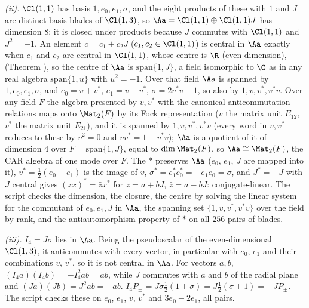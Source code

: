 \emph{(ii).} $\Cl(1,1)$ has basis $1, e_{0}, e_{1}, \sigma$, and the eight products of these with $1$ and $J$ are distinct basis blades of $\Cl(1,3)$, so $\Aa = \Cl(1,1) \oplus \Cl(1,1)J$ has dimension $8$; it is closed under products because $J$ commutes with $\Cl(1,1)$ and $J^{2} = -1$. An element $c = c_{1} + c_{2}J$ ($c_{1}, c_{2} \in \Cl(1,1)$) is central in $\Aa$ exactly when $c_{1}$ and $c_{2}$ are central in $\Cl(1,1)$, whose centre is $\R$ (even dimension), (Theorem ), so the centre of $\Aa$ is $\mathrm{span}\{1, J\}$, a field isomorphic to $\C$ as in any real algebra $\mathrm{span}\{1, u\}$ with $u^{2} = -1$. Over that field $\Aa$ is spanned by $1, e_{0}, e_{1}, \sigma$, and $e_{0} = v + v^{*}$, $e_{1} = v - v^{*}$, $\sigma = 2v^{*}v - 1$, so also by $1, v, v^{*}, v^{*}v$. Over any field $F$ the algebra presented by $v, v^{*}$ with the canonical anticommutation relations maps onto $\Mat_{2}(F)$ by its Fock representation ($v$ the matrix unit $E_{12}$, $v^{*}$ the matrix unit $E_{21}$), and it is spanned by $1, v, v^{*}, v^{*}v$ (every word in $v, v^{*}$ reduces to these by $v^{2} = 0$ and $vv^{*} = 1 - v^{*}v$); $\Aa$ is a quotient of it of dimension $4$ over $F = \mathrm{span}\{1, J\}$, equal to $\dim \Mat_{2}(F)$, so $\Aa \cong \Mat_{2}(F)$, the CAR algebra of one mode over $F$. The $*$ preserves $\Aa$ ($e_{0}$, $e_{1}$, $J$ are mapped into it), $v^{*} = \tfrac12(e_{0} - e_{1})$ is the image of $v$, $\sigma^{*} = e_{1}^{*}e_{0}^{*} = -e_{1}e_{0} = \sigma$, and $J^{*} = -J$ with $J$ central gives $(zx)^{*} = \bar{z}x^{*}$ for $z = a + bJ$, $\bar{z} = a - bJ$: conjugate-linear. The script checks the dimension, the closure, the centre by solving the linear system for the commutant of $e_{0}, e_{1}, J$ in $\Aa$, the spanning set $\{1, v, v^{*}, v^{*}v\}$ over the field by rank, and the antiautomorphism property of $*$ on all $256$ pairs of blades.

\emph{(iii).} $I_{4} = J\sigma$ lies in $\Aa$. Being the pseudoscalar of the even-dimensional $\Cl(1,3)$, it anticommutes with every vector, in particular with $e_{0}$, $e_{1}$ and their combinations $v$, $v^{*}$, so it is not central in $\Aa$. For vectors $a, b$, $(I_{4}a)(I_{4}b) = -I_{4}^{2}ab = ab$, while $J$ commutes with $a$ and $b$ of the radial plane and $(Ja)(Jb) = J^{2}ab = -ab$. $I_{4}P_{\pm} = J\sigma\tfrac12(1 \pm \sigma) = J\tfrac12(\sigma \pm 1) = \pm JP_{\pm}$. The script checks these on $e_{0}$, $e_{1}$, $v$, $v^{*}$ and $3e_{0} - 2e_{1}$, all pairs.

